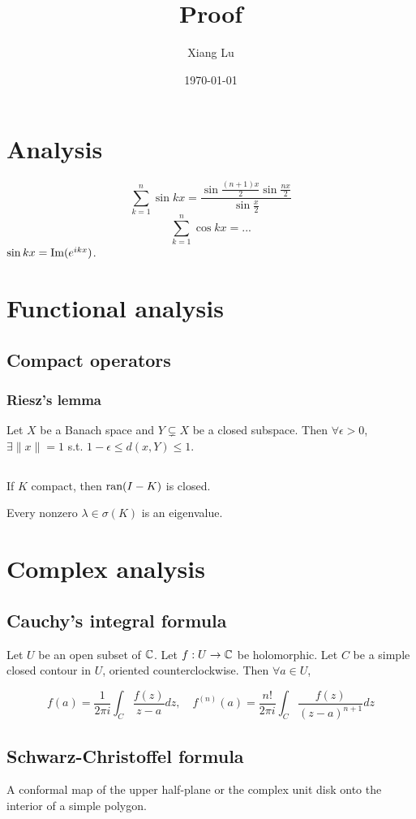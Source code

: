 \documentclass[12pt]{article} %
\title{Proof}
\author{Xiang Lu}
\date{\today}
\begin{document}
\maketitle

\setcounter{tocdepth}{2}
\tableofcontents

\section{Analysis}
\[ \sum_{k=1}^n \sin kx = \frac{\sin \frac{(n+1)x}{2} \sin \frac{nx}{2}}{\sin \frac{x}{2}} \]
\[ \sum_{k=1}^n \cos kx = ... \]
\Prf $\sin kx = \text{Im} (e^{ikx})$.  \QED

\section{Functional analysis}
\subsection{Compact operators}
\subsubsection{Riesz's lemma}
Let $X$ be a Banach space and $Y \subsetneq X$ be a closed subspace. Then $\forall \epsilon > 0$, $\exists \|x\|=1$ s.t. $1-\epsilon \le d(x,Y) \le 1$.

\subsection{}
If $K$ compact, then $\text{ran}(I-K)$ is closed.

Every nonzero $\lambda\in \sigma(K)$ is an eigenvalue.
 
\section{Complex analysis}
\subsection{Cauchy's integral formula}
Let $U$ be an open subset of $\mathbb{C}$. Let $f: U \to \mathbb{C}$ be holomorphic. Let $C$ be a simple closed contour in $U$, oriented counterclockwise. Then $\forall a \in U$,

\[ f(a) = \frac{1}{2\pi i} \int_C \frac{f(z)}{z-a} dz, \quad f^{(n)}(a) = \frac{n!}{2\pi i} \int_C \frac{f(z)}{(z-a)^{n+1}} dz \]

\subsection{Schwarz-Christoffel formula}
A conformal map of the upper half-plane or the complex unit disk onto the interior of a simple polygon.
\end{document}
